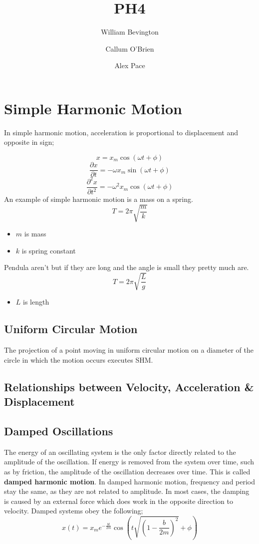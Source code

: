 \documentclass{article}
\title{PH4}
\author{William Bevington \and Callum O'Brien \and Alex Pace}
\begin{document}
\maketitle
\tableofcontents
\newpage

\section{Simple Harmonic Motion}

\noindent In simple harmonic motion, acceleration is proportional to displacement and opposite in sign;

\[x=x_m\cos(\omega t+\phi)\]
\[\frac{\partial x}{\partial t}=-\omega x_m\sin(\omega t+\phi)\]
\[\frac{\partial^2x}{\partial t^2}=-\omega^2x_m\cos(\omega t+\phi)\]
An example of simple harmonic motion is a mass on a spring. 
\[T=2\pi\sqrt{\frac{m}{k}}\]
\begin{itemize}
	\item $m$ is mass
	\item $k$ is spring constant
\end{itemize}
Pendula aren't but if they are long and the angle is small they pretty much are.
\[T=2\pi\sqrt{\frac{L}{g}}\]
\begin{itemize}
	\item $L$ is length
\end{itemize}

\subsection{Uniform Circular Motion}
The projection of a point moving in uniform circular motion on a diameter of the circle in which the motion occurs executes SHM.

\subsection{Relationships between Velocity, Acceleration \& Displacement}

\subsection{Damped Oscillations}
The energy of an oscillating system is the only factor directly related to the amplitude of the oscillation. If energy is removed from the system over time, such as by friction, the amplitude of the oscillation decreases over time. This is called \textbf{damped harmonic motion}. In damped harmonic motion, frequency and period stay the same, as they are not related to amplitude. In most cases, the damping is caused by an external force which does work in the opposite direction to velocity. Damped systems obey the following;
\[x(t)=x_me^{-\frac{bt}{2m}}\cos\left(t\sqrt{\left(1-\frac{b}{2m}\right)^2}+\phi\right)\]
\end{document}
